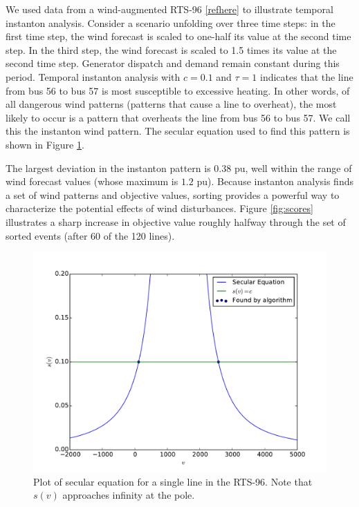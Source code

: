\documentclass[conference]{IEEEtran}
\begin{document}
We used data from a wind-augmented RTS-96 \ref{refhere} to illustrate temporal instanton analysis. Consider a scenario unfolding over three time steps: in the first time step, the wind forecast is scaled to one-half its value at the second time step. In the third step, the wind forecast is scaled to 1.5 times its value at the second time step. Generator dispatch and demand remain constant during this period. Temporal instanton analysis with $c=0.1$ and $\tau=1$ indicates that the line from bus 56 to bus 57 is most susceptible to excessive heating. In other words, of all dangerous wind patterns (patterns that cause a line to overheat), the most likely to occur is a pattern that overheats the line from bus 56 to bus 57. We call this the instanton wind pattern. The secular equation used to find this pattern is shown in Figure \ref{fig:secular}.

The largest deviation in the instanton pattern is $0.38$ pu, well within the range of wind forecast values (whose maximum is $1.2$ pu). Because instanton analysis finds a set of wind patterns and objective values, sorting provides a powerful way to characterize the potential effects of wind disturbances. Figure \eqref{fig:scores} illustrates a sharp increase in objective value roughly halfway through the set of sorted events (after 60 of the 120 lines).

\begin{figure}
\centering
\includegraphics[width=1\linewidth]{../images/secular2}
\caption{Plot of secular equation for a single line in the RTS-96. Note that $s(v)$ approaches infinity at the pole.}
\label{fig:secular}
\end{figure}
\end{document}

